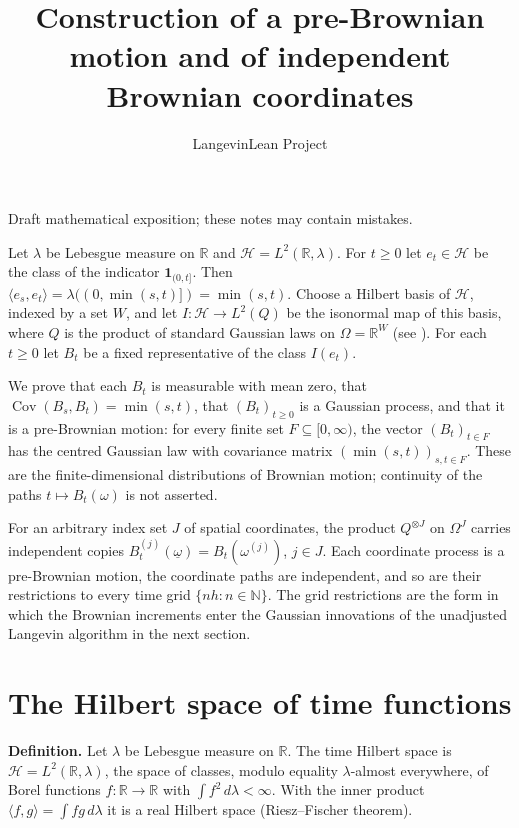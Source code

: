 \documentclass[11pt,a4paper]{article}
\title{\texorpdfstring{Construction of a pre-Brownian motion and of independent Brownian coordinates}{Construction of a pre-Brownian motion and of independent Brownian coordinates}}
\author{LangevinLean Project}
\date{}
\begin{document}
\maketitle
Draft mathematical exposition; these notes may contain mistakes.


Let \(\lambda\) be Lebesgue measure on \(\mathbb R\) and \(\mathcal H=L^2(\mathbb R,\lambda)\). For \(t\ge0\) let \(e_t\in\mathcal H\) be the class of the indicator \(\mathbf 1_{(0,t]}\). Then \(\langle e_s,e_t\rangle=\lambda((0,\min(s,t)])=\min(s,t)\). Choose a Hilbert basis of \(\mathcal H\), indexed by a set \(W\), and let \(I:\mathcal H\to L^2(Q)\) be the isonormal map of this basis, where \(Q\) is the product of standard Gaussian laws on \(\Omega=\mathbb R^W\) (see \cite[Section~3.6.12]{LangevinLean2026ULASC}). For each \(t\ge0\) let \(B_t\) be a fixed representative of the class \(I(e_t)\).




We prove that each \(B_t\) is measurable with mean zero, that \(\operatorname{Cov}(B_s,B_t)=\min(s,t)\), that \((B_t)_{t\ge0}\) is a Gaussian process, and that it is a pre-Brownian motion: for every finite set \(F\subseteq[0,\infty)\), the vector \((B_t)_{t\in F}\) has the centred Gaussian law with covariance matrix \((\min(s,t))_{s,t\in F}\). These are the finite-dimensional distributions of Brownian motion; continuity of the paths \(t\mapsto B_t(\omega)\) is not asserted.




For an arbitrary index set \(J\) of spatial coordinates, the product \(Q^{\otimes J}\) on \(\Omega^J\) carries independent copies \(B^{(j)}_t(\underline\omega)=B_t(\omega^{(j)})\), \(j\in J\). Each coordinate process is a pre-Brownian motion, the coordinate paths are independent, and so are their restrictions to every time grid \(\{nh:n\in\mathbb N\}\). The grid restrictions are the form in which the Brownian increments enter the Gaussian innovations of the unadjusted Langevin algorithm in the next section.


\section{\texorpdfstring{The Hilbert space of time functions}{The Hilbert space of time functions}}


\textbf{Definition.} Let \(\lambda\) be Lebesgue measure on \(\mathbb R\). The time Hilbert space is \(\mathcal H=L^2(\mathbb R,\lambda)\), the space of classes, modulo equality \(\lambda\)-almost everywhere, of Borel functions \(f:\mathbb R\to\mathbb R\) with \(\int f^2\,d\lambda<\infty\). With the inner product \(\langle f,g\rangle=\int fg\,d\lambda\) it is a real Hilbert space (Riesz–Fischer theorem).
\end{document}
